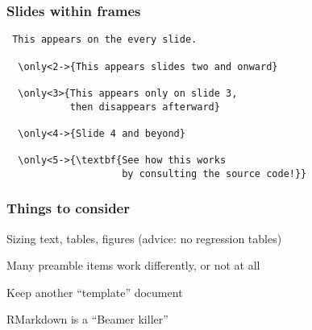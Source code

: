 \documentclass[10pt]{beamer}
\begin{document}
\begin{frame}[fragile]\frametitle{Slides within frames}
    
\begin{verbatim}
 This appears on the every slide.
  
  \only<2->{This appears slides two and onward}
  
  \only<3>{This appears only on slide 3, 
           then disappears afterward}
  
  \only<4->{Slide 4 and beyond}
  
  \only<5->{\textbf{See how this works 
                    by consulting the source code!}}
\end{verbatim}

\end{frame}




\begin{frame}\frametitle{Things to consider}
    
Sizing text, tables, figures (advice: no regression tables)

Many preamble items work differently, or not at all

Keep another ``template'' document

RMarkdown is a ``Beamer killer''

\end{frame}
\end{document}
